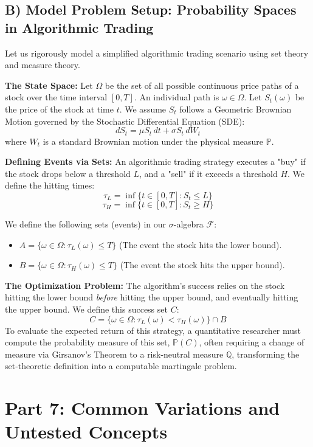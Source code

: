 \documentclass[11pt]{article}
\theoremstyle{definition}
\theoremstyle{remark}
\begin{document}
\subsection{B) Model Problem Setup: Probability Spaces in Algorithmic Trading}
Let us rigorously model a simplified algorithmic trading scenario using set theory and measure theory.

\textbf{The State Space:} Let $\Omega$ be the set of all possible continuous price paths of a stock over the time interval $[0, T]$. An individual path is $\omega \in \Omega$.
Let $S_t(\omega)$ be the price of the stock at time $t$. We assume $S_t$ follows a Geometric Brownian Motion governed by the Stochastic Differential Equation (SDE):
\[ dS_t = \mu S_t \, dt + \sigma S_t \, dW_t \]
where $W_t$ is a standard Brownian motion under the physical measure $\mathbb{P}$.

\textbf{Defining Events via Sets:}
An algorithmic trading strategy executes a "buy" if the stock drops below a threshold $L$, and a "sell" if it exceeds a threshold $H$. We define the hitting times:
\[ \tau_L = \inf \{ t \in [0, T] : S_t \le L \} \]
\[ \tau_H = \inf \{ t \in [0, T] : S_t \ge H \} \]

We define the following sets (events) in our $\sigma$-algebra $\mathcal{F}$:
\begin{itemize}
    \item $A = \{ \omega \in \Omega : \tau_L(\omega) \le T \}$ (The event the stock hits the lower bound).
    \item $B = \{ \omega \in \Omega : \tau_H(\omega) \le T \}$ (The event the stock hits the upper bound).
\end{itemize}

\textbf{The Optimization Problem:}
The algorithm's success relies on the stock hitting the lower bound \textit{before} hitting the upper bound, and eventually hitting the upper bound. We define this success set $C$:
\[ C = \{ \omega \in \Omega : \tau_L(\omega) < \tau_H(\omega) \} \cap B \]
To evaluate the expected return of this strategy, a quantitative researcher must compute the probability measure of this set, $\mathbb{P}(C)$, often requiring a change of measure via Girsanov's Theorem to a risk-neutral measure $\mathbb{Q}$, transforming the set-theoretic definition into a computable martingale problem.

\newpage
\section{Part 7: Common Variations and Untested Concepts}
\end{document}
